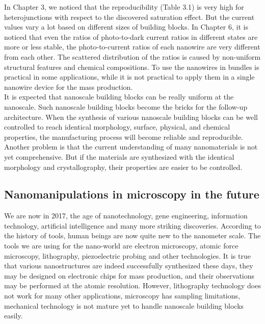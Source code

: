 In Chapter 3, we noticed that the reproducibility (Table 3.1) is very high for heterojunctions with respect to the discovered saturation effect. 
But the current values vary a lot based on different sizes of building blocks. 
In Chapter 6, it is noticed that even the ratios of photo-to-dark current ratios in different states are more or less stable, the photo-to-current ratios of each nanowire are very different from each other. 
The scattered distribution of the ratios is caused by non-uniform structural features and chemical compositions. 
To use the nanowires in bundles is practical in some applications, while it is not practical to apply them in a single nanowire device for the mass production. \\

It is expected that nanoscale building blocks can be really uniform at the nanoscale. Such nanoscale building blocks become the bricks for the follow-up architecture. When the synthesis of various nanoscale building blocks can be well controlled to reach identical morphology, surface, physical, and chemical properties, the manufacturing process will become reliable and reproducible. \\

Another problem is that the current understanding of many nanomaterials is not yet comprehensive. But if the materials are synthesized with the identical morphology and crystallography, their properties are easier to be controlled. 

\subsection{Nanomanipulations in microscopy in the future}
We are now in 2017, the age of nanotechnology, gene engineering, information technology, artificial intelligence and many more striking discoveries. According to the history of tools, human beings are now quite new to the nanometer scale. The tools we are using for the nano-world are electron microscopy, atomic force microscopy, lithography, piezoelectric probing and other technologies. It is true that various nanostructures are indeed successfully synthesized these days, they may be designed on electronic chips for mass production, and their observations may be performed at the atomic resolution. However, lithography technology does not work for many other applications, microscopy has sampling limitations, mechanical technology is not mature yet to handle nanoscale building blocks easily. 

